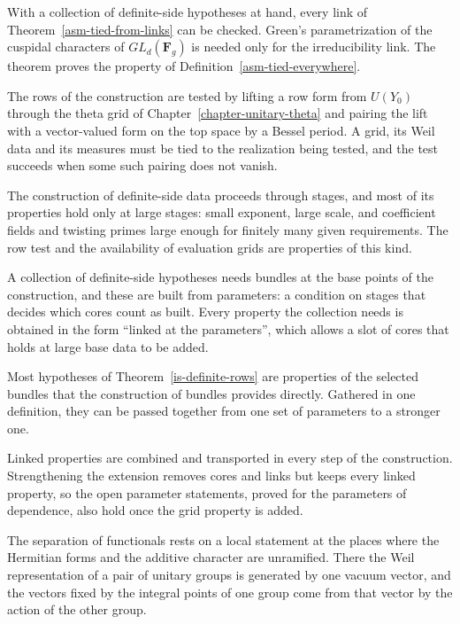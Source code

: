 With a collection of definite-side hypotheses at hand, every link of
Theorem~\ref{asm-tied-from-links} can be checked. Green's parametrization of
the cuspidal characters of $GL_d(\mathbf F_g)$ is needed only for the
irreducibility link. The theorem proves the property of
Definition~\ref{asm-tied-everywhere}.

The rows of the construction are tested by lifting a row form from $U(Y_0)$
through the theta grid of Chapter~\ref{chapter-unitary-theta} and pairing the
lift with a vector-valued form on the top space by a Bessel period. A grid,
its Weil data and its measures must be tied to the realization being tested,
and the test succeeds when some such pairing does not vanish.

The construction of definite-side data proceeds through stages, and most of
its properties hold only at large stages: small exponent, large scale, and
coefficient fields and twisting primes large enough for finitely many given
requirements. The row test and the availability of evaluation grids are
properties of this kind.

A collection of definite-side hypotheses needs bundles at the base points of
the construction, and these are built from parameters: a condition on stages
that decides which cores count as built. Every property the collection needs
is obtained in the form ``linked at the parameters'', which allows a slot of
cores that holds at large base data to be added.

Most hypotheses of Theorem~\ref{is-definite-rows} are properties of the
selected bundles that the construction of bundles provides directly. Gathered
in one definition, they can be passed together from one set of parameters to
a stronger one.

Linked properties are combined and transported in every step of the
construction. Strengthening the extension removes cores and links but keeps
every linked property, so the open parameter statements, proved for the
parameters of dependence, also hold once the grid property is added.

The separation of functionals rests on a local statement at the places where the
Hermitian forms and the additive character are unramified. There the Weil
representation of a pair of unitary groups is generated by one vacuum vector, and
the vectors fixed by the integral points of one group come from that vector by
the action of the other group.

